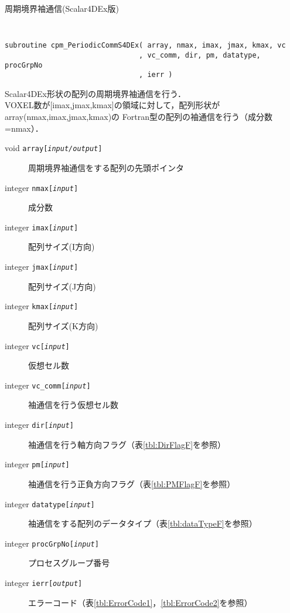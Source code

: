 \begin{spacing}{0.8}
\begin{itembox}[l]{周期境界袖通信(Scalar4DEx版)}
{\tt
\begin{verbatim}
subroutine cpm_PeriodicCommS4DEx( array, nmax, imax, jmax, kmax, vc
                                , vc_comm, dir, pm, datatype, procGrpNo
                                , ierr )
\end{verbatim}
}
Scalar4DEx形状の配列の周期境界袖通信を行う．\\
VOXEL数が[imax,jmax,kmax]の領域に対して，配列形状がarray(nmax,imax,jmax,kmax)の
Fortran型の配列の袖通信を行う（成分数=nmax）．
\begin{description}
\item[void    {\tt array[{\it input/output}]}] 周期境界袖通信をする配列の先頭ポインタ
\item[integer {\tt nmax[{\it input}]}] 成分数
\item[integer {\tt imax[{\it input}]}] 配列サイズ(I方向)
\item[integer {\tt jmax[{\it input}]}] 配列サイズ(J方向)
\item[integer {\tt kmax[{\it input}]}] 配列サイズ(K方向)
\item[integer {\tt vc[{\it input}]}] 仮想セル数
\item[integer {\tt vc\_comm[{\it input}]}] 袖通信を行う仮想セル数
\item[integer {\tt dir[{\it input}]}] 袖通信を行う軸方向フラグ（表\ref{tbl:DirFlagF}を参照）
\item[integer {\tt pm[{\it input}]}] 袖通信を行う正負方向フラグ（表\ref{tbl:PMFlagF}を参照）
\item[integer {\tt datatype[{\it input}]}] 袖通信をする配列のデータタイプ（表\ref{tbl:dataTypeF}を参照）
\item[integer {\tt procGrpNo[{\it input}]}] プロセスグループ番号
\item[integer {\tt ierr[{\it output}]}] エラーコード（表\ref{tbl:ErrorCode1}，\ref{tbl:ErrorCode2}を参照）
\end{description}
\end{itembox}\\
\end{spacing}
